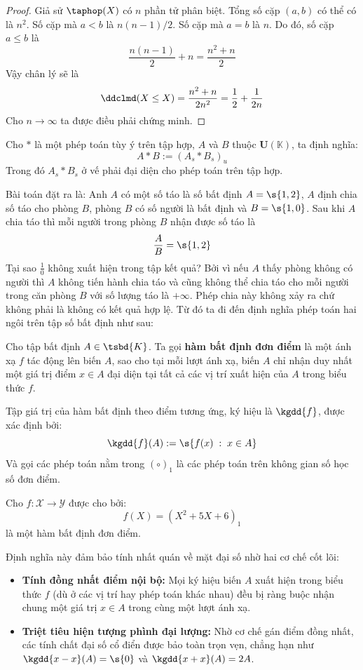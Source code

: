\begin{proof}
	Giả sử $\taphop(X)$ có $n$ phần tử phân biệt. Tổng số cặp $(a,b)$ có thể có là $n^2$.	Số cặp mà $a<b$ là $n(n-1)/2$.	Số cặp mà $a=b$ là $n$.	Do đó, số cặp $a\leq b$ là $$\frac{n(n-1)}{2} + n = \frac{n^2+n}{2}$$	
	Vậy chân lý sẽ là $$\ddclmd(X\leq X ) = \frac{n^2+n}{2n^2} = \frac{1}{2} + \frac{1}{2n}$$
	Cho $n \rightarrow \infty$ ta được điều phải chứng minh.
\end{proof}
\begin{definition}
	Cho $*$ là một phép toán tùy ý trên tập hợp, $A$ và $B$ thuộc $\mathbf{U}(\mathbb{K})$, ta định nghĩa:
	\[
	A * B := (A_s * B_s)_u
	\]
	Trong đó $A_s * B_s$ ở vế phải đại diện cho phép toán trên tập hợp.
\end{definition}
\begin{example}
	Bài toán đặt ra là: Anh $A$ có một số táo là số bất định $A=\s{1,2}$, $A$ định chia số táo cho phòng $B$, phòng $B$ có số người là bất định và $B = \s{1,0}$. Sau khi $A$ chia táo thì mỗi người trong phòng $B$ nhận được số táo là \[\frac{A}{B} = \s{1,2}\] Tại sao $\frac{1}{0}$ không xuất hiện trong tập kết quả? Bởi vì nếu $A$ thấy phòng không có người thì $A$ không tiến hành chia táo và cũng không thể chia táo cho mỗi người trong căn phòng $B$ với số lượng táo là $+\infty$. Phép chia này không xảy ra chứ không phải là không có kết quả hợp lệ. Từ đó ta đi đến định nghĩa phép toán hai ngôi trên tập số bất định như sau:
\end{example}
\begin{definition}
	Cho tập bất định $A \in \tsbd{K}$. Ta gọi \textbf{hàm bất định đơn điểm} là một ánh xạ $f$ tác động lên biến $A$, sao cho tại mỗi lượt ánh xạ, biến $A$ chỉ nhận duy nhất một giá trị điểm $x \in A$ đại diện tại tất cả các vị trí xuất hiện của $A$ trong biểu thức $f$.
	
	Tập giá trị của hàm bất định theo điểm tương ứng, ký hiệu là $\kgdd{f}$, được xác định bởi:
	\[
	\kgdd{f}(A) := \s{f(x) \;:\; x \in A}
	\]
	Và gọi các phép toán nằm trong $(\circ)_1$ là các phép toán trên không gian số học số đơn điểm.
\end{definition}
\begin{example}
	Cho $f : \mathcal{X} \to \mathcal{Y}$ được cho bởi:
	\[f(X) = (X^2+5X+6)_1\] là một hàm bất định đơn điểm.
\end{example}
\begin{remark}
	Định nghĩa này đảm bảo tính nhất quán về mặt đại số nhờ hai cơ chế cốt lõi:
	\begin{itemize}
		\item \textbf{Tính đồng nhất điểm nội bộ:} Mọi ký hiệu biến $A$ xuất hiện trong biểu thức $f$ (dù ở các vị trí hay phép toán khác nhau) đều bị ràng buộc nhận chung một giá trị $x \in A$ trong cùng một lượt ánh xạ.
		\item \textbf{Triệt tiêu hiện tượng phình đại lượng:} Nhờ cơ chế gán điểm đồng nhất, các tính chất đại số cổ điển được bảo toàn trọn vẹn, chẳng hạn như $\kgdd{x - x}(A) = \s{0}$ và $\kgdd{x + x}(A) = 2A$.
	\end{itemize}
\end{remark}

